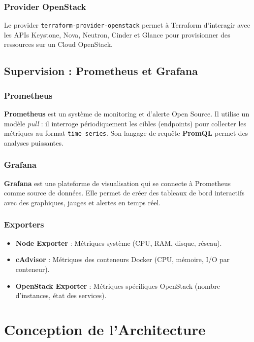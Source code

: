 \documentclass[12pt,a4paper,oneside]{book}
\begin{document}
\subsection{Provider OpenStack}
Le provider \texttt{terraform-provider-openstack} permet \`a Terraform d'interagir avec les APIs Keystone, Nova, Neutron, Cinder et Glance pour provisionner des ressources sur un Cloud OpenStack.

\section{Supervision : Prometheus et Grafana}

\subsection{Prometheus}
\textbf{Prometheus} est un syst\`eme de monitoring et d'alerte Open Source. Il utilise un mod\`ele \textit{pull} : il interroge p\'eriodiquement les cibles (endpoints) pour collecter les m\'etriques au format \texttt{time-series}. Son langage de requ\^ete \textbf{PromQL} permet des analyses puissantes.

\subsection{Grafana}
\textbf{Grafana} est une plateforme de visualisation qui se connecte \`a Prometheus comme source de donn\'ees. Elle permet de cr\'eer des tableaux de bord interactifs avec des graphiques, jauges et alertes en temps r\'eel.

\subsection{Exporters}
\begin{itemize}
    \item \textbf{Node Exporter} : M\'etriques syst\`eme (CPU, RAM, disque, r\'eseau).
    \item \textbf{cAdvisor} : M\'etriques des conteneurs Docker (CPU, m\'emoire, I/O par conteneur).
    \item \textbf{OpenStack Exporter} : M\'etriques sp\'ecifiques OpenStack (nombre d'instances, \'etat des services).
\end{itemize}

\chapter{Conception de l'Architecture}
\end{document}
